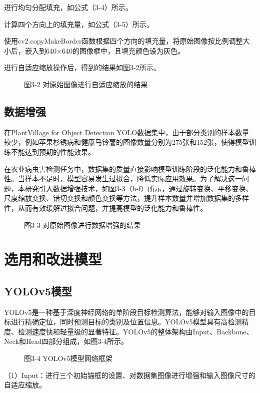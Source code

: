\documentclass[12pt, a4paper, twoside]{ctexart}
\begin{document}
进行均匀分配填充，如公式（3-4）所示。

计算四个方向上的填充量，如公式（3-5）所示。

使用cv2.copyMakeBorder函数根据四个方向的填充量，将原始图像按比例调整大小后，嵌入到640×640的图像框中，且填充颜色设为灰色。

进行自适应缩放操作后，得到的结果如图3-2所示。


\begin{figure}[htbp]
\centering
\caption{图3-2 对原始图像进行自适应缩放的结果}
\end{figure}


\subsection{数据增强}

在PlantVillage for Object Detection YOLO数据集中，由于部分类别的样本数量较少，例如苹果杉锈病和健康马铃薯的图像数量分别为275张和152张，使得模型训练不能达到预期的性能效果。

在农业病虫害检测任务中，数据集的质量直接影响模型训练阶段的泛化能力和鲁棒性。当样本不足时，模型容易发生过拟合，降低实际应用效果。为了解决这一问题，本研究引入数据增强技术，如图3-3（b-f）所示，通过旋转变换、平移变换、尺度缩放变换、错切变换和颜色变换等方法，提升样本数量并增加数据集的多样性，从而有效缓解过拟合问题，并提高模型的泛化能力和鲁棒性。


\begin{figure}[htbp]
\centering
\caption{图3-3 对原始图像进行数据增强的结果}
\end{figure}


\section{选用和改进模型}


\subsection{YOLOv5模型}

YOLOv5是一种基于深度神经网络的单阶段目标检测算法，能够对输入图像中的目标进行精确定位，同时预测目标的类别及位置信息。YOLOv5模型具有高检测精度、检测速度快和轻量级的显著特征。YOLOv5的整体架构由Input、Backbone、Neck和Head四部分组成，如图3-4所示。


\begin{figure}[htbp]
\centering
\caption{图3-4 YOLOv5模型网络框架}
\end{figure}

（1）Input：进行三个初始锚框的设置、对数据集图像进行增强和输入图像尺寸的自适应缩放。
\end{document}

